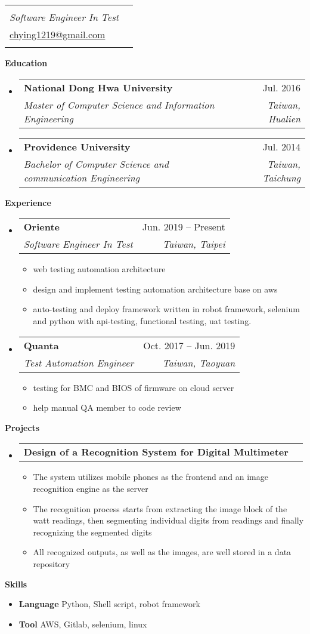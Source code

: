 \documentclass[letterpaper,12pt]{article}[leftmargin=*]
\makeatletter
\def \fullname {Phoebe Lin}
\def \subtitle {Software Engineer In Test}
\def \phoneicon {\faPhone}
\def \phonetext {0928-914-201}
\def \emailicon {\faEnvelope}
\def \emaillink {mailto:chying1219@gmail.com}
\def \emailtext {chying1219@gmail.com}
\def \headertype {\singlecol}
\def \entryspacing {10pt}
\def \phone {\phoneicon \hspace{3pt}{ \phonetext}}
\def \email {\emailicon \hspace{3pt}\href{\emaillink}{\emailtext}}
\renewcommand{\section}[2]{\vspace{10pt}
  \colorbox{secondary}{\color{white}\raggedbottom\normalsize\textbf{{#1}{\hspace{7pt}#2}}}
}
\newcommand{\resumeEntryStart}{\begin{itemize}[leftmargin=2.5mm]}
\newcommand{\resumeEntryEnd}{\end{itemize}\vspace{\entryspacing}}
\newcommand{\resumeItemListStart}{\begin{itemize}[leftmargin=4.5mm]}
\newcommand{\resumeItemListEnd}{\end{itemize}}
\newcommand{\resumeItem}[1]{
  \item\small{
    {#1 \vspace{-2pt}}
  }
}
\newcommand{\resumeEntryTSDL}[4]{
  \vspace{-2pt}\item[]
    \begin{tabularx}{0.97\textwidth}{X@{\hspace{60pt}}r}
      \textbf{\color{primary}#1} & {\firabook\color{accent}\small#2} \\
      \textit{\color{accent}\small#3} & \textit{\color{accent}\small#4} \\
    \end{tabularx}\vspace{2pt}
}
\newcommand{\resumeEntryTD}[2]{
  \vspace{-1pt}\item[]
    \begin{tabularx}{0.97\textwidth}{X@{\hspace{60pt}}r}
      \textbf{\color{primary}#1} & {\firabook\color{accent}\small#2} \\
    \end{tabularx}\vspace{-2pt}
}
\newcommand{\resumeEntryS}[2]{
  \item[]\small{
    \textbf{\color{primary}#1 }{ #2 \vspace{-6pt}}
  }
}
\newcommand{\singlecol}[3]{
  \begin{tabularx}{\textwidth}{Xr}
    {
      \begin{tabular}[b]{l}
        \fontsize{35}{45}\selectfont{\color{primary}{{\textbf{\fullname}}}} \\
        {\textit{\subtitle}} 
      \end{tabular}
    } & {
      \begin{tabular}[c]{l}
        {\small#1} \\
        {\small#2} \\
        {\small#3} 
      \end{tabular}
    }
  \end{tabularx}
}
\makeatother
\begin{document}

\headertype{\phone}{\email}{}
\vspace{-15pt}

\section{\faGraduationCap}{Education}

  \resumeEntryStart
    \resumeEntryTSDL
      {National Dong Hwa University}{Jul. 2016}
      {Master of Computer Science and Information Engineering}{Taiwan, Hualien}

    \resumeEntryTSDL
      {Providence University}{Jul. 2014}
      {Bachelor of Computer Science and communication Engineering}{Taiwan, Taichung}
  \resumeEntryEnd

\section{\faPieChart}{Experience}

  \resumeEntryStart
    \resumeEntryTSDL
      {Oriente}{Jun. 2019 -- Present}
      {Software Engineer In Test}{Taiwan, Taipei}
    \resumeItemListStart
      \resumeItem {web testing automation architecture}
      \resumeItem {design and implement testing automation architecture base on aws}
      \resumeItem {auto-testing and deploy framework written in robot framework, selenium and python with api-testing, functional testing, uat testing.}
    \resumeItemListEnd
  \resumeEntryEnd

  \resumeEntryStart
    \resumeEntryTSDL
      {Quanta}{Oct. 2017 -- Jun. 2019}
      {Test Automation Engineer}{Taiwan, Taoyuan}
    \resumeItemListStart
      \resumeItem {testing for BMC and BIOS of firmware on cloud server}
      \resumeItem {help manual QA member to code review}
    \resumeItemListEnd
  \resumeEntryEnd


\section{\faFlask}{Projects}

  \resumeEntryStart
    \resumeEntryTD
      {Design of a Recognition System for Digital Multimeter}{}
        \resumeItemListStart
      \resumeItem {The system utilizes mobile phones as the frontend and an image recognition engine as the server}
    \resumeItemListEnd
    \resumeItemListStart
      \resumeItem {The recognition process starts from extracting the image block of the watt readings, then segmenting individual digits from readings and finally recognizing the segmented digits}
    \resumeItemListEnd
    \resumeItemListStart
      \resumeItem {All recognized outputs, as well as the images, are well stored in a data repository}
    \resumeItemListEnd
  \resumeEntryEnd

\section{\faGears}{Skills}
 \resumeEntryStart
  \resumeEntryS{Language } {Python, Shell script, robot framework}
  \resumeEntryS{Tool } {AWS, Gitlab, selenium, linux}
 \resumeEntryEnd
\end{document}
